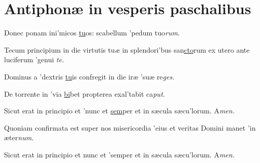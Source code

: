 \documentclass[initial=ZallmanCaps,staff=19,font=greciliae,11pt,a4paper,openany,twoside,choralsign=PfefferMediaeval]{gregorian}
\begin{document}
\section*{Antiphonæ in vesperis paschalibus}
\par
\vskip9bp
\begin{multicols}{2}\setlength{\columnseprule}{0.2px}
Donec ponam ini'micos \underline{tu}os: \grestar{} scabellum 'pedum tuo\textit{rum}.\par
{}\par
Tecum principium in die virtutis tu\textit{æ} \gredagger{} in splendori'bus san\underline{cto}rum \grestar{} ex utero ante luciferum 'genui \textit{te.}\par
{}\par
Dominus a 'dextris \underline{tu}is \grestar{} confregit in die iræ 'suæ re\textit{ges.}\par
{}\par
De torrente in 'via \underline{bi}bet \grestar{} propterea exal'tabit ca\textit{put.}\par
{}\par
Sicut erat in principio et 'nunc et \underline{sem}per \grestar{} et in sæcula sæcu'lorum. A\textit{men.}\par
\end{multicols}\newpage
{}
\par
\vskip9bp
\begin{multicols}{2}\setlength{\columnseprule}{0.2px}
Quoniam confirmata est super nos misericordia 'eius \grestar{} et veritas Domini manet 'in æter\textit{num.}\par
{}\par
Sicut erat in principio et nunc et 'semper \grestar{} et in sæcula sæcu'lorum. A\textit{men.}\par
\end{multicols}
\end{document}
